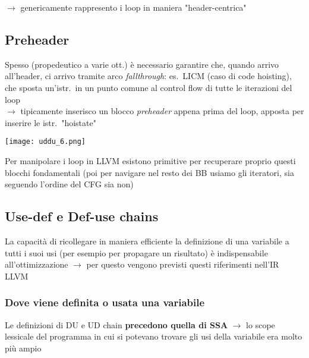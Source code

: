 $\rightarrow$ genericamente rappresento i loop in maniera "header-centrica"

\subsection{Preheader}

\noindent\begin{minipage}[c]{.65\textwidth}
Spesso (propedeutico a varie ott.) \`e necessario garantire che, quando arrivo all'header, ci arrivo tramite arco \textit{fallthrough}: es.~LICM (caso di code hoisting), che sposta un'istr.~in un punto comune al control flow di tutte le iterazioni del loop\\
$\rightarrow$ tipicamente inserisco un blocco \textit{preheader} appena prima del loop, apposta per inserire le istr.~"hoistate"
\end{minipage}\hfill
\begin{minipage}[c]{.3\textwidth}
\texttt{[image: uddu\_6.png]}
\end{minipage}

\begin{emphasize}
  Per manipolare i loop in LLVM esistono primitive per recuperare proprio questi blocchi fondamentali (poi per navigare nel resto dei BB usiamo gli iteratori, sia seguendo l'ordine del CFG sia non)
\end{emphasize}

\subsection{Use-def e Def-use chains}

La capacit\`a di ricollegare in maniera efficiente la definizione di una variabile a tutti i suoi usi (per esempio per propagare un risultato) \`e indispensabile all'ottimizzazione $\rightarrow$ per questo vengono previsti questi riferimenti nell'IR LLVM

\subsubsection{Dove viene definita o usata una variabile}

Le definizioni di DU e UD chain \textbf{precedono quella di SSA} $\rightarrow$ lo scope lessicale del programma in cui si potevano trovare gli usi della variabile era molto pi\`u ampio

